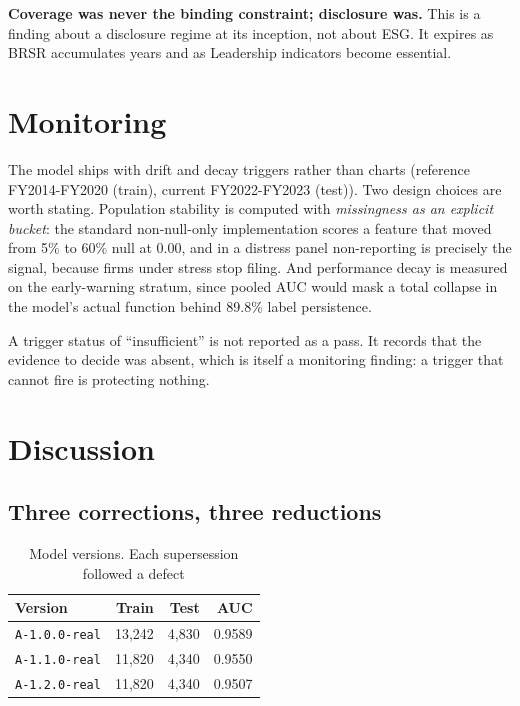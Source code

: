 \documentclass[conference]{IEEEtran}
\begin{document}
\textbf{Coverage was never the binding constraint; disclosure was.} This is a
finding about a disclosure regime at its inception, not about ESG. It expires
as BRSR accumulates years and as Leadership indicators become essential.

\section{Monitoring}

The model ships with drift and decay triggers rather than charts
(reference FY2014-FY2020 (train), current FY2022-FY2023 (test)). Two design choices
are worth stating. Population stability is computed with \emph{missingness as
an explicit bucket}: the standard non-null-only implementation scores a
feature that moved from 5\% to 60\% null at 0.00, and in a distress panel
non-reporting is precisely the signal, because firms under stress stop filing.
And performance decay is measured on the early-warning stratum, since pooled
AUC would mask a total collapse in the model's actual function behind 89.8\%
label persistence.

A trigger status of ``insufficient'' is not reported as a pass. It records
that the evidence to decide was absent, which is itself a monitoring finding:
a trigger that cannot fire is protecting nothing.

\section{Discussion}

\subsection{Three corrections, three reductions}

\begin{table}[htbp]
\caption{Model versions. Each supersession followed a defect}
\label{tab:versions}
\centering
\begin{tabular}{lrrr}
\toprule
Version & Train & Test & AUC \\
\midrule
\texttt{A-1.0.0-real} & 13,242 & 4,830 & 0.9589 \\
\texttt{A-1.1.0-real} & 11,820 & 4,340 & 0.9550 \\
\texttt{A-1.2.0-real} & 11,820 & 4,340 & 0.9507 \\
\bottomrule
\end{tabular}
\end{table}
\end{document}

